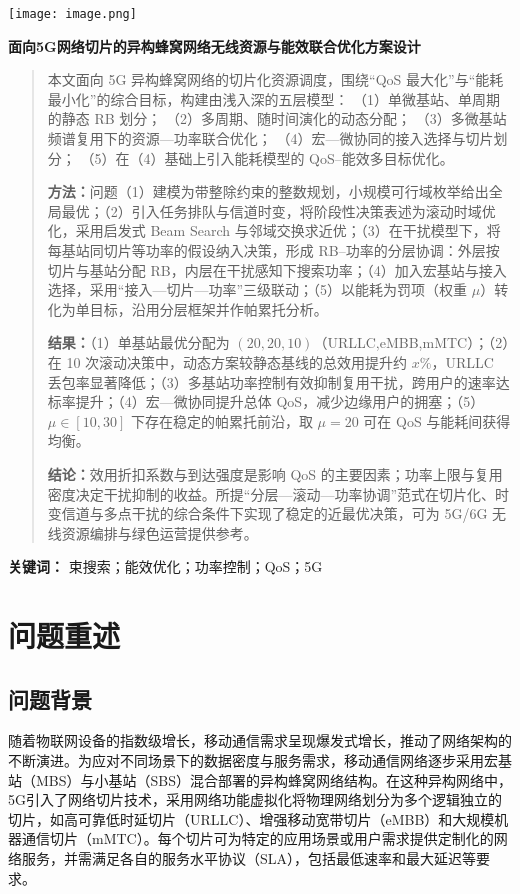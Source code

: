 \documentclass{ctexart}
\begin{document}
 
 \texttt{[image: image.png]} %
 \vspace{1cm} %
 {\centering 
 
 \Huge \bfseries 面向5G网络切片的异构蜂窝网络无线资源与能效联合优化方案设计 \par}
 \vspace{2cm} %

\begin{abstract}
\noindent
本文面向 5G 异构蜂窝网络的切片化资源调度，围绕“QoS 最大化”与“能耗最小化”的综合目标，构建由浅入深的五层模型：
（1）单微基站、单周期的静态 RB 划分；
（2）多周期、随时间演化的动态分配；
（3）多微基站频谱复用下的资源—功率联合优化；
（4）宏—微协同的接入选择与切片划分；
（5）在（4）基础上引入能耗模型的 QoS–能效多目标优化。

\medskip\noindent
\textbf{方法：}问题（1）建模为带整除约束的整数规划，小规模可行域枚举给出全局最优；（2）引入任务排队与信道时变，将阶段性决策表述为滚动时域优化，采用启发式 Beam Search 与邻域交换求近优；（3）在干扰模型下，将每基站同切片等功率的假设纳入决策，形成 RB–功率的分层协调：外层按切片与基站分配 RB，内层在干扰感知下搜索功率；（4）加入宏基站与接入选择，采用“接入—切片—功率”三级联动；（5）以能耗为罚项（权重 $\mu$）转化为单目标，沿用分层框架并作帕累托分析。

\medskip\noindent
\textbf{结果：}（1）单基站最优分配为 $(20,20,10)$（URLLC,eMBB,mMTC）；（2）在 10 次滚动决策中，动态方案较静态基线的总效用提升约 $x\%$，URLLC 丢包率显著降低；（3）多基站功率控制有效抑制复用干扰，跨用户的速率达标率提升；（4）宏—微协同提升总体 QoS，减少边缘用户的拥塞；（5）$\mu\in[10,30]$ 下存在稳定的帕累托前沿，取 $\mu=20$ 可在 QoS 与能耗间获得均衡。

\medskip\noindent
\textbf{结论：}效用折扣系数与到达强度是影响 QoS 的主要因素；功率上限与复用密度决定干扰抑制的收益。所提“分层—滚动—功率协调”范式在切片化、时变信道与多点干扰的综合条件下实现了稳定的近最优决策，可为 5G/6G 无线资源编排与绿色运营提供参考。

\end{abstract}

\noindent\textbf{关键词：} 束搜索；能效优化；功率控制；QoS；5G


\section{问题重述}

\subsection{问题背景}
随着物联网设备的指数级增长，移动通信需求呈现爆发式增长，推动了网络架构的不断演进。为应对不同场景下的数据密度与服务需求，移动通信网络逐步采用宏基站（MBS）与小基站（SBS）混合部署的异构蜂窝网络结构。在这种异构网络中，5G引入了网络切片技术，采用网络功能虚拟化将物理网络划分为多个逻辑独立的切片，如高可靠低时延切片（URLLC）、增强移动宽带切片（eMBB）和大规模机器通信切片（mMTC）。每个切片可为特定的应用场景或用户需求提供定制化的网络服务，并需满足各自的服务水平协议（SLA），包括最低速率和最大延迟等要求。
\end{document}
